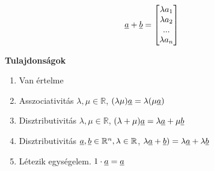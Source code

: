   \begin{frame}
  
    \begin{tcolorbox}[title={Def.: Szorzás számmal}]	
		\begin{align}
			\underline{a} + \underline{b} &= \begin{bmatrix}
				{\lambda}a_1 \\
				{\lambda}a_2 \\
				... \\
				{\lambda}a_n
			\end{bmatrix}
		\end{align}
		
		\tcblower
		
		\textbf{Tulajdonságok} \\		
		
		 \msmallskip
		 
		 \begin{enumerate}
		 	\item Van értelme
		 	\item Asszociativitás ${\lambda}, {\mu} \in \mathbb{R}$, $({\lambda}{\mu})\underline{a} = {\lambda}({\mu}\underline{a})$
		 	\item Disztributivitás ${\lambda}, {\mu} \in \mathbb{R}$, $({\lambda} + {\mu})\underline{a} = {\lambda}\underline{a} + {\mu}\underline{b}$
		 	\item Disztributivitás $\underline{a}, \underline{b} \in \mathbb{R}^n, {\lambda} \in \mathbb{R}$, ${\lambda}\underline{a} + \underline{b}) = {\lambda}\underline{a} + {\lambda}\underline{b}$
		 	\item Létezik egységelem. $1 \cdot \underline{a} = \underline{a}$
		 \end{enumerate}
		
	\end{tcolorbox}
  	
    \end{frame}
  
